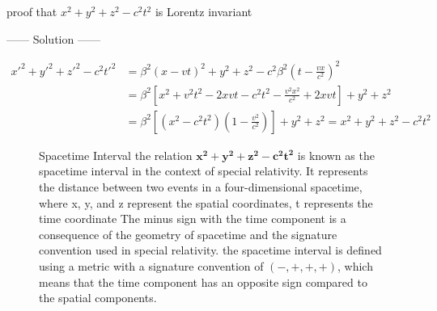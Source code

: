 \documentclass{article}
\begin{document}
\begin{example}
proof that $x^2 +y^2+z^2-c^2t^2$ is Lorentz invariant
\begin{center}
    ------ \textcolor{Solution}{Solution} ------
\end{center}
\begin{align*}
    {x'}^2 +{y'}^2+{z'}^2-c^2{t'}^2 &= \beta^2{(x-vt)}^2 + y^2 + z^2 - c^2\beta^2{\left(t - \frac{vx}{c^2}\right)}^2\\ 
                                    &= \beta^2\left[x^2 + v^2t^2 - 2xvt - c^2t^2 - \frac{v^2x^2}{c^2} + 2xvt\right] + y^2 + z^2\\ 
                                    &= \beta^2\left[\left(x^2 - c^2t^2\right) \left(1 - \frac{v^2}{c^2}\right)\right] + y^2 + z^2 = x^2 +y^2+z^2-c^2t^2
\end{align*}
\begin{figure}[b]
    \begin{enrichment*}{Spacetime Interval}
        the relation $\mathbf{x^2 +y^2+z^2-c^2t^2}$ is known as the spacetime interval in the context of special relativity.
        It represents the distance between two events in a four-dimensional spacetime,
        where x, y, and z represent the spatial coordinates, t represents the time coordinate
        The minus sign with the time component is a consequence of the geometry of spacetime and the signature convention used in special relativity.
        the spacetime interval is defined using a metric with a signature convention of $(-, +, +, +)$, which means that the time component has an opposite sign compared to the spatial components.
    \end{enrichment*}
    \end{figure}
\end{example}
\end{document}
